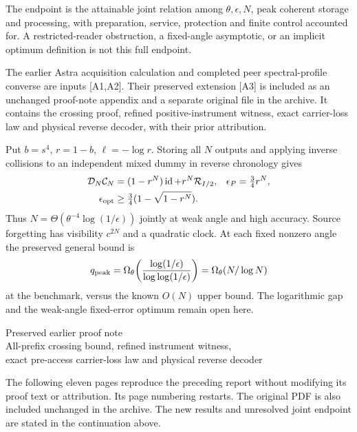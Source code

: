 \documentclass[11pt,a4paper]{article}
\newcommand{\id}{\operatorname{id}}\newcommand{\Tr}{\operatorname{Tr}}\newcommand{\SWAP}{\operatorname{SWAP}}
\begin{document}
The endpoint is the attainable joint relation among $\theta,\epsilon,N$, peak
coherent storage and processing, with preparation, service, protection and
finite control accounted for. A restricted-reader obstruction, a fixed-angle
asymptotic, or an implicit optimum definition is not this full endpoint.

The earlier Astra acquisition calculation and completed peer spectral-profile
converse are inputs [A1,A2]. Their preserved extension [A3] is included as an
unchanged proof-note appendix and a separate original file in the archive.
It contains the crossing proof, refined positive-instrument witness, exact
carrier-loss law and physical reverse decoder, with their prior attribution.

Put $b=s^4$, $r=1-b$, $\ell=-\log r$. Storing all $N$ outputs and applying
inverse collisions to an independent mixed dummy in reverse chronology gives
\begin{align}
 \mathcal D_N\mathcal C_N&=(1-r^N)\id+r^N\mathcal R_{I/2},
 &\epsilon_P&=\tfrac34r^N,\\
 \epsilon_{\rm opt}&\ge\tfrac34(1-\sqrt{1-r^N}).
\end{align}
Thus $N=\Theta(\theta^{-4}\log(1/\epsilon))$ jointly at weak angle and high
accuracy. Source forgetting has visibility $c^{2N}$ and a quadratic clock.
At each fixed nonzero angle the preserved general bound is
\[
 q_{\rm peak}=\Omega_\theta\!\left(\frac{\log(1/\epsilon)}
 {\log\log(1/\epsilon)}\right)=\Omega_\theta(N/\log N)
\]
at the benchmark, versus the known $O(N)$ upper bound. The logarithmic gap and
the weak-angle fixed-error optimum remain open here.





\clearpage\thispagestyle{empty}\vspace*{35mm}
\begin{center}
{\LARGE Preserved earlier proof note}\\[1em]
{\large All-prefix crossing bound, refined instrument witness,\\
exact pre-access carrier-loss law and physical reverse decoder}
\end{center}
\vspace{15mm}
The following eleven pages reproduce the preceding report without modifying
its proof text or attribution. Its page numbering restarts. The original PDF
is also included unchanged in the archive. The new results and unresolved
joint endpoint are stated in the continuation above.

\end{document}

